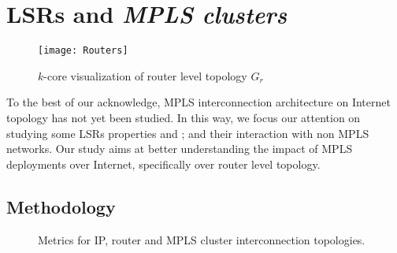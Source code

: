 \section{LSRs and \textit{MPLS clusters}}\label{cluster}
\begin{figure}[!t]
  \begin{center}
    \texttt{[image: Routers]}
  \end{center}
  \caption{$k$-core visualization of router level topology $G_{r}$ }
  \label{fig_k_core_routers}
\end{figure}

To the best of our acknowledge, MPLS interconnection architecture on Internet
topology has not yet been studied. In this way, we focus our attention on
studying some LSRs properties and  ; and their
interaction with non MPLS networks. Our study aims at better understanding the
impact of MPLS deployments over Internet, specifically over router level
topology.

\subsection{Methodology}\label{cluster.methodo}
\begin{figure*}[!htb]
  \begin{center}
    \hfil
    \hfil
  \end{center}
\caption{Metrics for IP, router and MPLS cluster interconnection
topologies.} 
\label{fig_metrics}        
\end{figure*}

